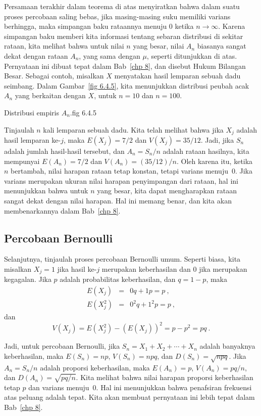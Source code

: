 Persamaan terakhir dalam teorema di atas menyiratkan bahwa dalam suatu proses percobaan saling bebas,
jika masing-masing suku memiliki varians berhingga, maka simpangan baku
rataannya menuju 0 ketika $n \rightarrow \infty$. Karena simpangan baku memberi kita
informasi tentang sebaran distribusi di sekitar rataan, kita melihat bahwa untuk nilai $n$
yang besar, nilai $A_n$ biasanya sangat dekat dengan rataan $A_n$, yang
sama dengan $\mu$, seperti ditunjukkan di atas. Pernyataan ini dibuat tepat dalam Bab~\ref{chp 8},
dan disebut Hukum Bilangan Besar. Sebagai contoh, misalkan $X$ menyatakan hasil lemparan
sebuah dadu seimbang. Dalam Gambar~\ref{fig 6.4.5}, kita menunjukkan distribusi peubah acak
$A_n$ yang berkaitan dengan $X$, untuk $n = 10$ dan $n = 100$.

{Distribusi empiris $A_n$.}{fig 6.4.5}

\begin{example}\label{exam 6.14} Tinjaulah $n$ kali lemparan sebuah dadu. Kita telah melihat bahwa jika
$X_j$ adalah hasil lemparan
ke-$j$, maka $E(X_j) = 7/2$ dan $V(X_j) = 35/12$. Jadi, jika $S_n$ adalah jumlah
hasil-hasil tersebut, dan $A_n = S_n/n$ adalah rataan hasilnya, kita mempunyai
$E(A_n) = 7/2$ dan $V(A_n) = (35/12)/n$. Oleh karena itu, ketika $n$ bertambah, nilai harapan
rataan tetap konstan, tetapi varians menuju~0. Jika varians
merupakan ukuran nilai harapan penyimpangan dari rataan, hal ini menunjukkan bahwa untuk
$n$ yang besar, kita dapat mengharapkan rataan sangat dekat dengan nilai harapan. Hal ini memang
benar, dan kita akan membenarkannya dalam Bab~\ref{chp 8}.
\end{example}

\subsection*{Percobaan Bernoulli}

Selanjutnya, tinjaulah proses percobaan Bernoulli umum. Seperti biasa, kita misalkan $X_j = 1$ jika
hasil ke-$j$ merupakan keberhasilan dan 0 jika merupakan kegagalan. Jika $p$ adalah probabilitas
keberhasilan, dan $q = 1 - p$, maka
\begin{eqnarray*} E(X_j) & = & 0q + 1p = p\ , \\ E(X_j^2) & = & 0^2q + 1^2p = p\ ,
\end{eqnarray*} dan
$$ V(X_j) = E(X_j^2) - (E(X_j))^2 = p - p^2 = pq\ .
$$

Jadi, untuk percobaan Bernoulli, jika $S_n = X_1 + X_2 +\cdots+ X_n$ adalah banyaknya
keberhasilan, maka $E(S_n) = np$, $V(S_n) = npq$, dan $D(S_n) = \sqrt{npq}.$ Jika
$A_n = S_n/n$ adalah proporsi keberhasilan, maka $E(A_n) = p$, $V(A_n) = pq/n$,
dan $D(A_n) = \sqrt{pq/n}$. Kita melihat bahwa nilai harapan proporsi keberhasilan tetap
$p$ dan varians menuju~0. Hal ini menunjukkan bahwa penafsiran frekuensi atas
peluang adalah tepat. Kita akan membuat pernyataan ini lebih tepat dalam Bab~\ref{chp 8}.

